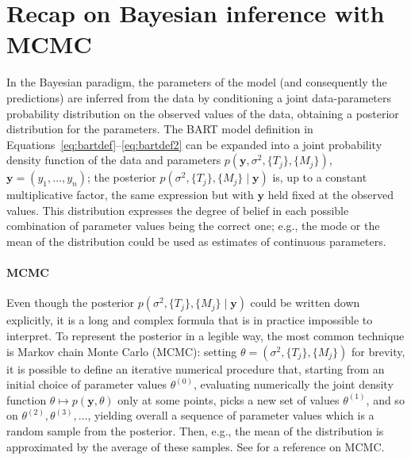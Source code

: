 \documentclass{article}
\begin{document}
\printbibliography

\clearpage
\appendix

\section{Recap on Bayesian inference with MCMC}
\label{sec:bayesrecap}

In the Bayesian paradigm, the parameters of the model (and consequently the
predictions) are inferred from the data by conditioning a joint data-parameters probability
distribution on the observed values of the data, obtaining a posterior
distribution for the parameters. The BART model definition in
Equations~\ref{eq:bartdef}--\ref{eq:bartdef2} can be expanded into a joint
probability density function of the data and parameters $p(\mathbf y, \sigma^2,
	\{T_j\}, \{M_j\})$, $\mathbf y = (y_1, \ldots, y_n)$; the posterior $p(\sigma^2, \{T_j\}, \{M_j\}\mid \mathbf y)$
is, up to a constant multiplicative factor, the same expression but with
$\mathbf y$ held fixed at the observed values. This distribution expresses the
degree of belief in each possible combination of parameter values being the
correct one; e.g., the mode or the mean of the distribution could be used as
estimates of continuous parameters.

\paragraph{MCMC}

Even though the posterior $p(\sigma^2, \{T_j\}, \{M_j\}\mid \mathbf y)$ could be
written down explicitly, it is a long and complex formula that is in practice
impossible to interpret. To represent the posterior in a legible way, the most
common technique is Markov chain Monte Carlo (MCMC): setting $\theta=(\sigma^2,
	\{T_j\}, \{M_j\})$ for brevity, it is possible to define an iterative numerical
procedure that, starting from an initial choice of parameter values
$\theta^{(0)}$, evaluating numerically the joint density function
$\theta\mapsto p(\mathbf y,\theta)$ only at some points, picks a new set of
values $\theta^{(1)}$, and so on $\theta^{(2)}, \theta^{(3)}, \ldots$, yielding
overall a sequence of parameter values which is a random sample from the
posterior. Then, e.g., the mean of the distribution is approximated by the
average of these samples. See \citet{brooks2011} for a reference on MCMC.
\end{document}
